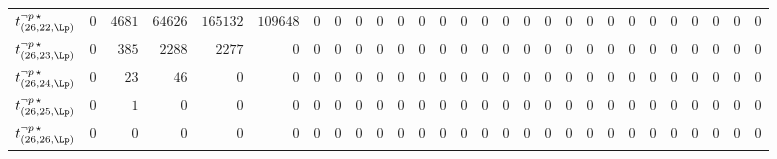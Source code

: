 \begin{tabular}{r|rrrrrrrrrrrrrrrrrrrrrrrrrrr}
  $t^{\neg p \, \star}_{(26,22,\Lp)}$ & $0$ & $4681$ & $64626$ & $165132$ & $109648$ & $0$ & $0$ & $0$ & $0$ & $0$ & $0$ & $0$ & $0$ & $0$ & $0$ & $0$ & $0$ & $0$ & $0$ & $0$ & $0$ & $0$ & $0$ & $0$ & $0$ & $0$ & $0$ \\
  $t^{\neg p \, \star}_{(26,23,\Lp)}$ & $0$ & $385$ & $2288$ & $2277$ & $0$ & $0$ & $0$ & $0$ & $0$ & $0$ & $0$ & $0$ & $0$ & $0$ & $0$ & $0$ & $0$ & $0$ & $0$ & $0$ & $0$ & $0$ & $0$ & $0$ & $0$ & $0$ & $0$ \\
  $t^{\neg p \, \star}_{(26,24,\Lp)}$ & $0$ & $23$ & $46$ & $0$ & $0$ & $0$ & $0$ & $0$ & $0$ & $0$ & $0$ & $0$ & $0$ & $0$ & $0$ & $0$ & $0$ & $0$ & $0$ & $0$ & $0$ & $0$ & $0$ & $0$ & $0$ & $0$ & $0$ \\
  $t^{\neg p \, \star}_{(26,25,\Lp)}$ & $0$ & $1$ & $0$ & $0$ & $0$ & $0$ & $0$ & $0$ & $0$ & $0$ & $0$ & $0$ & $0$ & $0$ & $0$ & $0$ & $0$ & $0$ & $0$ & $0$ & $0$ & $0$ & $0$ & $0$ & $0$ & $0$ & $0$ \\
  $t^{\neg p \, \star}_{(26,26,\Lp)}$ & $0$ & $0$ & $0$ & $0$ & $0$ & $0$ & $0$ & $0$ & $0$ & $0$ & $0$ & $0$ & $0$ & $0$ & $0$ & $0$ & $0$ & $0$ & $0$ & $0$ & $0$ & $0$ & $0$ & $0$ & $0$ & $0$ & $0$ \\
\end{tabular}
